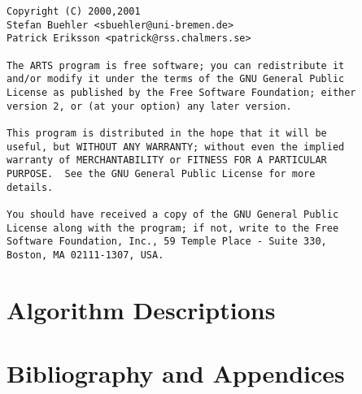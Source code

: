 \newpage                          
\thispagestyle{empty}
\vspace*{\fill}
\noindent
\begin{verbatim}
Copyright (C) 2000,2001 
Stefan Buehler <sbuehler@uni-bremen.de>
Patrick Eriksson <patrick@rss.chalmers.se>

The ARTS program is free software; you can redistribute it
and/or modify it under the terms of the GNU General Public
License as published by the Free Software Foundation; either
version 2, or (at your option) any later version.

This program is distributed in the hope that it will be
useful, but WITHOUT ANY WARRANTY; without even the implied
warranty of MERCHANTABILITY or FITNESS FOR A PARTICULAR
PURPOSE.  See the GNU General Public License for more
details. 

You should have received a copy of the GNU General Public
License along with the program; if not, write to the Free
Software Foundation, Inc., 59 Temple Place - Suite 330,
Boston, MA 02111-1307, USA. 
\end{verbatim}
\cleardoublepage

\tableofcontents

\cleardoublepage
{}
     

%
%

%

%
\part{Algorithm Descriptions}

%
%

%
%
%
%
%
% 
%
%
%
%


%
%
\part{Bibliography and Appendices}
%

%
%
%  
%  


%
%
\printindex







